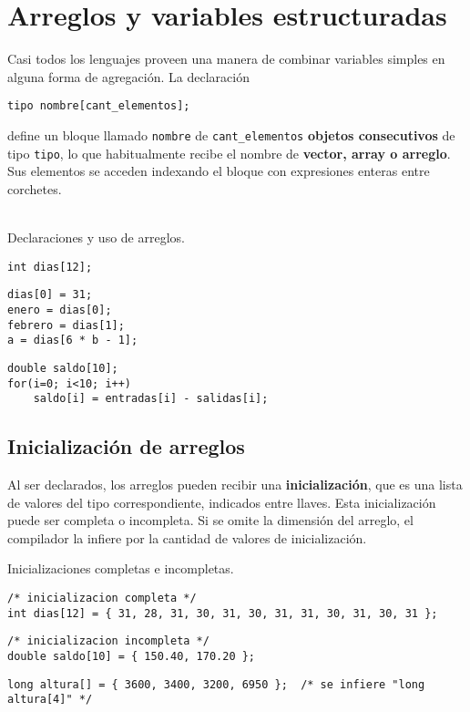 


\chapter{Arreglos y variables estructuradas}

Casi todos los lenguajes proveen una manera de combinar variables simples en
alguna forma de agregación. La declaración
\begin{lstlisting}
tipo nombre[cant_elementos];
\end{lstlisting}

define un bloque llamado \lstinline{nombre} de \lstinline{cant_elementos} \textbf{objetos consecutivos} de tipo
\lstinline{tipo}, lo que habitualmente recibe el nombre de \textbf{vector, array o arreglo}. Sus
elementos se acceden indexando el bloque con expresiones enteras entre
corchetes.
\\
\\ 

\begin{ejemplo}
Declaraciones y uso de arreglos.
\begin{lstlisting}
int dias[12];
\end{lstlisting}
\begin{lstlisting}
dias[0] = 31;
enero = dias[0];
febrero = dias[1];
a = dias[6 * b - 1];
\end{lstlisting}
\begin{lstlisting}
double saldo[10];
for(i=0; i<10; i++)
    saldo[i] = entradas[i] - salidas[i];
\end{lstlisting}
\end{ejemplo}

\section{Inicialización de arreglos}

Al ser declarados, los arreglos pueden recibir una \textbf{inicialización}, que es una
lista de valores del tipo correspondiente, indicados entre llaves. Esta
inicialización puede ser completa o incompleta. Si se omite la dimensión del
arreglo, el compilador la infiere por la cantidad de valores de inicialización.

\begin{ejemplo}
Inicializaciones completas e incompletas.
\begin{lstlisting}
/* inicializacion completa */
int dias[12] = { 31, 28, 31, 30, 31, 30, 31, 31, 30, 31, 30, 31 };   
\end{lstlisting}
\begin{lstlisting}
/* inicializacion incompleta */
double saldo[10] = { 150.40, 170.20 };     
\end{lstlisting}
\begin{lstlisting}
long altura[] = { 3600, 3400, 3200, 6950 };  /* se infiere "long altura[4]" */
\end{lstlisting}
\end{ejemplo}

